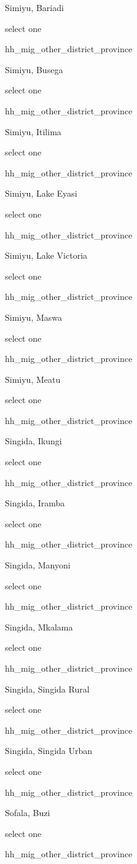 \documentclass[]{article}
\begin{document}
Simiyu, Bariadi

select one

hh\_mig\_other\_district\_province

Simiyu, Busega

select one

hh\_mig\_other\_district\_province

Simiyu, Itilima

select one

hh\_mig\_other\_district\_province

Simiyu, Lake Eyasi

select one

hh\_mig\_other\_district\_province

Simiyu, Lake Victoria

select one

hh\_mig\_other\_district\_province

Simiyu, Maswa

select one

hh\_mig\_other\_district\_province

Simiyu, Meatu

select one

hh\_mig\_other\_district\_province

Singida, Ikungi

select one

hh\_mig\_other\_district\_province

Singida, Iramba

select one

hh\_mig\_other\_district\_province

Singida, Manyoni

select one

hh\_mig\_other\_district\_province

Singida, Mkalama

select one

hh\_mig\_other\_district\_province

Singida, Singida Rural

select one

hh\_mig\_other\_district\_province

Singida, Singida Urban

select one

hh\_mig\_other\_district\_province

Sofala, Buzi

select one

hh\_mig\_other\_district\_province
\end{document}
